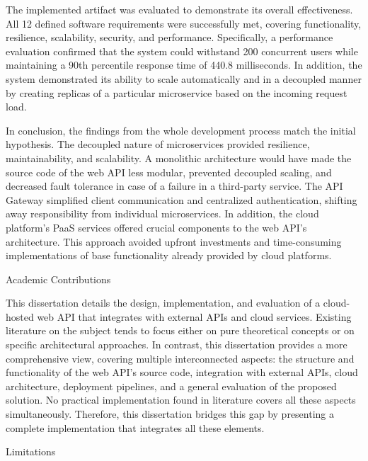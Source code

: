 \documentclass[12pt, reqno]{amsbook}
\makeatletter
\def\section{\@startsection{section}{1}%
      \z@{.5\linespacing\@plus.7\linespacing}{.25\linespacing}%
      {\normalfont\bfseries\flushleft}}
\theoremstyle{definition}
\theoremstyle{definition}
\numberwithin{section}{chapter}
\numberwithin{table}{chapter}
\numberwithin{figure}{chapter}
\makeatother
\begin{document}
The implemented artifact was evaluated to demonstrate its overall effectiveness. All 12 defined software requirements were successfully met, covering functionality, resilience, scalability, security, and performance. Specifically, a performance evaluation confirmed that the system could withstand 200 concurrent users while maintaining a 90th percentile response time of 440.8 milliseconds. In addition, the system demonstrated its ability to scale automatically and in a decoupled manner by creating replicas of a particular microservice based on the incoming request load.

In conclusion, the findings from the whole development process match the initial hypothesis. The decoupled nature of microservices provided resilience, maintainability, and scalability. A monolithic architecture would have made the source code of the web \ac{API} less modular, prevented decoupled scaling, and decreased fault tolerance in case of a failure in a third-party service. The \ac{API} Gateway simplified client communication and centralized authentication, shifting away responsibility from individual microservices. In addition, the cloud platform's \ac{PaaS} services offered crucial components to the web \ac{API}'s architecture. This approach avoided upfront investments and time-consuming implementations of base functionality already provided by cloud platforms.

\section{Academic Contributions}
\label{Section:Academic_Contributions}

This dissertation details the design, implementation, and evaluation of a cloud-hosted web \ac{API} that integrates with external \acp{API} and cloud services. Existing literature on the subject tends to focus either on pure theoretical concepts or on specific architectural approaches. In contrast, this dissertation provides a more comprehensive view, covering multiple interconnected aspects: the structure and functionality of the web \ac{API}'s source code, integration with external \acp{API}, cloud architecture, deployment pipelines, and a general evaluation of the proposed solution. No practical implementation found in literature covers all these aspects simultaneously. Therefore, this dissertation bridges this gap by presenting a complete implementation that integrates all these elements.

\section{Limitations}
\label{Section:Limitations}
\end{document}
